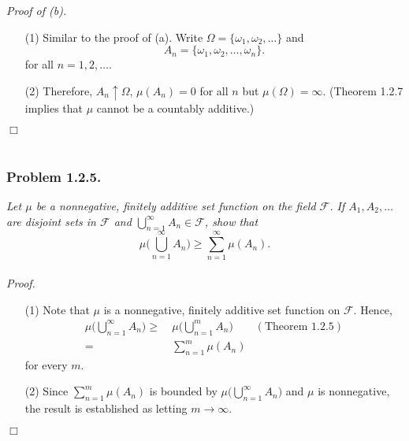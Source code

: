 \documentclass{article}
\begin{document}
\emph{Proof of (b).}
\begin{enumerate}
\item[(1)]
  Similar to the proof of (a).
  Write $\Omega = \{ \omega_1, \omega_2, \ldots \}$ and
  \[
    A_n = \{ \omega_1, \omega_2, \ldots, \omega_n \}.
  \]
  for all $n = 1, 2, \ldots$.

\item[(2)]
  Therefore, $A_n \uparrow \Omega$, $\mu(A_n) = 0$ for all $n$ but $\mu(\Omega) = \infty$.
  (Theorem 1.2.7 implies that $\mu$ cannot be a countably additive.)
\end{enumerate}
$\Box$ \\\\






\subsubsection*{Problem 1.2.5.}
\emph{Let $\mu$ be a nonnegative,
finitely additive set function on the field $\mathscr{F}$.
If $A_1, A_2, \ldots$ are disjoint sets in $\mathscr{F}$
and $\bigcup_{n=1}^{\infty} A_n \in \mathscr{F}$, show that}
\[
  \mu \Bigg( \bigcup_{n=1}^{\infty} A_n \Bigg)
  \geq
  \sum_{n=1}^{\infty} \mu(A_n).
\] \\



\emph{Proof.}
\begin{enumerate}
\item[(1)]
  Note that $\mu$ is a nonnegative, finitely additive set function on $\mathscr{F}$.
  Hence,
  \begin{align*}
    \mu \Bigg( \bigcup_{n=1}^{\infty} A_n \Bigg)
    \geq
    & \:
      \mu \Bigg( \bigcup_{n=1}^{m} A_n \Bigg)
      & (\text{Theorem 1.2.5}) \\
    =
    & \:
      \sum_{n=1}^{m} \mu(A_n)
  \end{align*}
  for every $m$.

\item[(2)]
  Since $\sum_{n=1}^{m} \mu(A_n)$ is bounded by $\mu \big( \bigcup_{n=1}^{\infty} A_n \big)$
  and $\mu$ is nonnegative,
  the result is established as letting $m \to \infty$.
\end{enumerate}
$\Box$ \\\\



\end{document}
